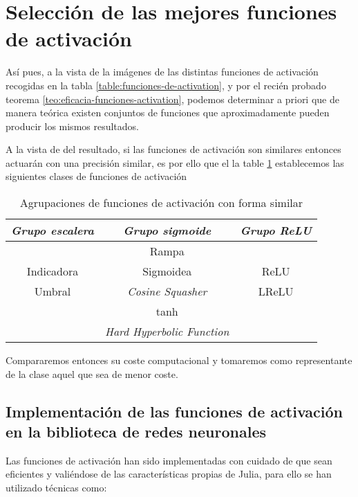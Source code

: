 \section{ Selección de las mejores funciones de activación}
Así pues, a la vista de la imágenes de las distintas funciones de activación 
recogidas en la tabla \ref{table:funciones-de-activation}, y
por el recién probado teorema \ref{teo:eficacia-funciones-activation}, podemos determinar a priori 
que de manera teórica existen conjuntos de funciones que aproximadamente  pueden producir los mismos resultados. 

A la vista de del resultado, si las funciones de 
activación son similares entonces actuarán con 
una precisión similar, es por ello 
que el la table \ref{table:Clases-equivalencia-activation-function} establecemos 
las siguientes clases de funciones de activación 

\begin{table}[H] 
    \centering  
    \begin{tabular}{| c | c | c | }
        \hline
        \textit{Grupo escalera} & \textit{Grupo sigmoide} & \textit{Grupo ReLU} \\
        \hline
       &  Rampa &  \\
       Indicadora & Sigmoidea & ReLU\\
       Umbral & \textit{Cosine Squasher}& LReLU\\
        & tanh & \\
        & \textit{Hard Hyperbolic Function}& \\
\hline
    \end{tabular}
    \caption{Agrupaciones de funciones de activación con forma similar}  
    \label{table:Clases-equivalencia-activation-function}
\end{table}

Compararemos entonces su coste computacional y tomaremos como representante de la clase aquel que sea de menor coste. 


\subsection{ Implementación de las funciones de activación en la biblioteca de redes neuronales} 
\label{ch06:activation-function-implementation}
Las funciones de activación han sido implementadas con cuidado de que sean eficientes 
y valiéndose de las características propias de Julia, para ello se han utilizado técnicas como: 

\setlength{\marginparwidth}{\bigMarginSize}

